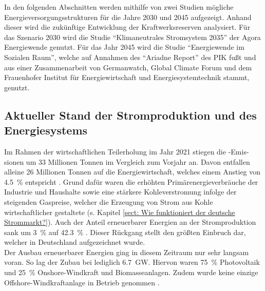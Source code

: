 	In den folgenden Abschnitten werden mithilfe von zwei Studien mögliche Energieversorgungsstrukturen für die Jahre 2030 und 2045 aufgezeigt.
	Anhand dieser wird die zukünftige Entwicklung der Kraftwerksreserven analysiert.
	Für das Szenario 2030 wird die Studie "`Klimaneutrales Stromsystem 2035"' der Agora Energiewende genutzt.
	Für das Jahr 2045 wird die Studie "`Energiewende im Sozialen Raum"', welche auf Annahmen des "`Ariadne Report"' des PIK fußt und aus einer Zusammenarbeit von Germanwatch, Global Climate Forum und dem Frauenhofer Institut für Energiewirtschaft und Energiesystemtechnik stammt, genutzt.

	\subsection{Aktueller Stand der Stromproduktion und des Energiesystems}
	
		Im Rahmen der wirtschaftlichen Teilerholung im Jahr 2021 stiegen die \COO-Emis-sionen um 33 Millionen Tonnen im Vergleich zum Vorjahr an.
		Davon entfallen alleine 26 Millionen Tonnen auf die Energiewirtschaft, welches einem  Anstieg von \SI{4,5}{\percent} entspricht \cite[S.5]{Stand_der_Dinge}. 
		Grund dafür waren die erhöhten Primärenergieverbräuche der Industrie und Haushalte sowie eine stärkere Kohleverstromung infolge der steigenden Gaspreise, welcher die Erzeugung von Strom aus Kohle wirtschaftlicher gestaltete (s. Kapitel \ref{sect: Wie funktioniert der deutsche Strommarkt?}). 
		Auch der Anteil erneuerbarer Energien an der Stromproduktion sank um \SI{3}{\percent} auf \SI{42,3}{\percent} \cite[S.5]{Stand_der_Dinge}.
		Dieser Rückgang stellt den größten Einbruch dar, welcher in Deutschland aufgezeichnet wurde. \\
		
		Der Ausbau erneuerbarer Energien ging in diesem Zeitraum nur sehr langsam voran. 
		So lag der Zubau bei lediglich \SI{6,7}{\giga\watt}. 
		Hiervon waren \SI{75}{\percent} Photovoltaik und \SI{25}{\percent} Onshore-Windkraft und Biomasseanlagen. 
		Zudem wurde keine einzige Offshore-Windkraftanlage in Betrieb genommen \cite[S.47 ff.]{Stand_der_Dinge}. 
	

